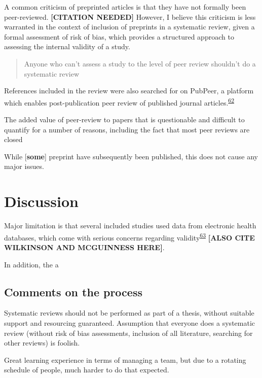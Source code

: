 \documentclass[a4paper, twoside]{templates/ociamthesis}
\begin{document}
A common criticism of preprinted articles is that they have not formally been peer-reviewed. \textbf{{[}CITATION NEEDED{]}} However, I believe this criticism is less warranted in the context of inclusion of preprints in a systematic review, given a formal assessment of risk of bias, which provides a structured approach to assessing the internal validity of a study.

\begin{quote}
Anyone who can't assess a study to the level of peer review shouldn't do a systematic review
\end{quote}

References included in the review were also searched for on PubPeer, a platform which enables post-publication peer review of published journal articles.\textsuperscript{\protect\hyperlink{ref-hunter2012}{62}}

The added value of peer-review to papers that is questionable and difficult to quantify for a number of reasons, including the fact that most peer reviews are closed

While {[}\textbf{some}{]} preprint have subsequently been published, this does not cause any major issues.

\hypertarget{discussion-1}{%
\section{Discussion}\label{discussion-1}}

Major limitation is that several included studies used data from electronic health databases, which come with serious concerns regarding validity\textsuperscript{\protect\hyperlink{ref-hsieh2019}{63}} \textbf{{[}ALSO CITE WILKINSON AND MCGUINNESS HERE{]}}.

In addition, the a

\hypertarget{comments-on-the-process}{%
\subsection{Comments on the process}\label{comments-on-the-process}}

Systematic reviews should not be performed as part of a thesis, without suitable support and resourcing guaranteed. Assumption that everyone does a systematic review (without risk of bias assessments, inclusion of all literature, searching for other reviews) is foolish.

Great learning experience in terms of managing a team, but due to a rotating schedule of people, much harder to do that expected.
\end{document}
